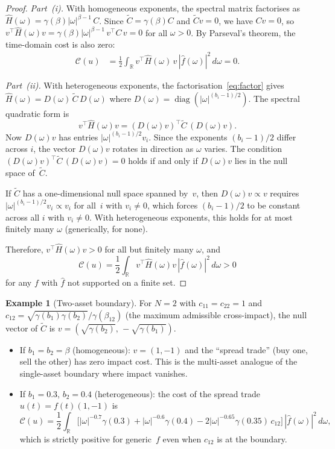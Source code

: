 \documentclass[12pt]{article}
\theoremstyle{definition}
\newtheorem{example}[theorem]{Example}
\theoremstyle{remark}
\newcommand{\R}{\mathbb{R}}
\newcommand{\bC}{\widetilde{C}}
\newcommand{\diag}{\operatorname{diag}}
\begin{document}
\begin{proof}
\emph{Part~(i).}
With homogeneous exponents, the spectral matrix factorises as
$\widehat{H}(\omega) = \gamma(\beta)|\omega|^{\beta-1}\,C$.
Since $\bC = \gamma(\beta)C$ and $\bC v = 0$, we have $Cv = 0$, so
$v^\top\widehat{H}(\omega)v = \gamma(\beta)|\omega|^{\beta-1}\,v^\top C\,v = 0$
for all $\omega > 0$.  By Parseval's theorem, the time-domain cost is also zero:
\begin{align*}
  \mathcal{C}(u) &= \frac{1}{2}\int_\R v^\top\widehat{H}(\omega)\,v\,
    |\hat{f}(\omega)|^2\,d\omega = 0.
\end{align*}

\smallskip\noindent
\emph{Part~(ii).}
With heterogeneous exponents, the factorisation~\eqref{eq:factor} gives
$\widehat{H}(\omega) = D(\omega)\,\bC\,D(\omega)$ where
$D(\omega) = \diag(|\omega|^{(b_i-1)/2})$.  The spectral quadratic form is
\[
  v^\top\widehat{H}(\omega)v = (D(\omega)v)^\top\bC\,(D(\omega)v).
\]
Now $D(\omega)v$ has entries $|\omega|^{(b_i-1)/2}v_i$.  Since the exponents
$(b_i-1)/2$ differ across $i$, the vector $D(\omega)v$ rotates in direction as
$\omega$ varies.  The condition $(D(\omega)v)^\top\bC\,(D(\omega)v) = 0$ holds
if and only if $D(\omega)v$ lies in the null space of~$\bC$.

If $\bC$ has a one-dimensional null space spanned by~$v$, then
$D(\omega)v \propto v$ requires $|\omega|^{(b_i-1)/2}v_i \propto v_i$ for all~$i$
with $v_i\neq 0$, which forces $(b_i-1)/2$ to be constant across all $i$
with $v_i\neq 0$.  With heterogeneous exponents, this holds for at most finitely
many $\omega$ (generically, for none).

Therefore, $v^\top\widehat{H}(\omega)v > 0$ for all but finitely many $\omega$, and
\[
  \mathcal{C}(u) = \frac{1}{2}\int_\R v^\top\widehat{H}(\omega)v\,|\hat{f}(\omega)|^2\,d\omega > 0
\]
for any $f$ with $\hat{f}$ not supported on a finite set.
\end{proof}

\begin{example}[Two-asset boundary]\label{ex:boundary_2asset}
For $N=2$ with $c_{11}=c_{22}=1$ and $c_{12} = \sqrt{\gamma(b_1)\gamma(b_2)}/\gamma(\beta_{12})$
(the maximum admissible cross-impact), the null vector of $\bC$ is
$v = (\sqrt{\gamma(b_2)},\,-\sqrt{\gamma(b_1)})$.
\begin{itemize}[nosep]
\item If $b_1 = b_2 = \beta$ (homogeneous): $v = (1,-1)$ and the ``spread trade''
  (buy one, sell the other) has zero impact cost.  This is the multi-asset analogue
  of the single-asset boundary where impact vanishes.
\item If $b_1 = 0.3$, $b_2 = 0.4$ (heterogeneous): the cost of the spread trade
  $u(t) = f(t)(1,-1)$ is
  \[
    \mathcal{C}(u) = \frac{1}{2}\int_\R
      \bigl[|\omega|^{-0.7}\gamma(0.3) + |\omega|^{-0.6}\gamma(0.4)
        - 2|\omega|^{-0.65}\gamma(0.35)\,c_{12}\bigr]\,|\hat{f}(\omega)|^2\,d\omega,
  \]
  which is strictly positive for generic~$f$ even when $c_{12}$ is at the boundary.
\end{itemize}
\end{example}
\end{document}
